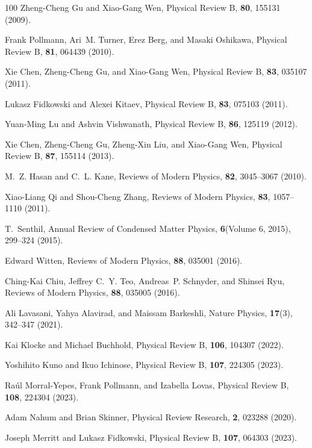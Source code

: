 \documentclass[preprint,pteplogo]{ptephy_v2}%
\numberwithin{equation}{section}
\theoremstyle{definition}
\begin{document}
\begin{thebibliography}{100}
Zheng-Cheng Gu and Xiao-Gang Wen, Physical Review B, {\bf 80}, 155131 (2009).

Frank Pollmann, Ari~M. Turner, Erez Berg, and Masaki Oshikawa, Physical Review B, {\bf 81}, 064439 (2010).

Xie Chen, Zheng-Cheng Gu, and Xiao-Gang Wen, Physical Review B, {\bf 83}, 035107 (2011).

Lukasz Fidkowski and Alexei Kitaev, Physical Review B, {\bf 83}, 075103 (2011).

Yuan-Ming Lu and Ashvin Vishwanath, Physical Review B, {\bf 86}, 125119 (2012).

Xie Chen, Zheng-Cheng Gu, Zheng-Xin Liu, and Xiao-Gang Wen, Physical Review B, {\bf 87}, 155114 (2013).

M.~Z. Hasan and C.~L. Kane, Reviews of Modern Physics, {\bf 82}, 3045--3067 (2010).

Xiao-Liang Qi and Shou-Cheng Zhang, Reviews of Modern Physics, {\bf 83}, 1057--1110 (2011).

T.~Senthil, Annual Review of Condensed Matter Physics, {\bf 6}(Volume 6, 2015), 299--324 (2015).

Edward Witten, Reviews of Modern Physics, {\bf 88}, 035001 (2016).

Ching-Kai Chiu, Jeffrey C.~Y. Teo, Andreas~P. Schnyder, and Shinsei Ryu, Reviews of Modern Physics, {\bf 88}, 035005 (2016).

Ali Lavasani, Yahya Alavirad, and Maissam Barkeshli, Nature Physics, {\bf 17}(3), 342--347 (2021).

Kai Klocke and Michael Buchhold, Physical Review B, {\bf 106}, 104307 (2022).

Yoshihito Kuno and Ikuo Ichinose, Physical Review B, {\bf 107}, 224305 (2023).

Ra\'ul Morral-Yepes, Frank Pollmann, and Izabella Lovas, Physical Review B, {\bf 108}, 224304 (2023).

Adam Nahum and Brian Skinner, Physical Review Research, {\bf 2}, 023288 (2020).

Joseph Merritt and Lukasz Fidkowski, Physical Review B, {\bf 107}, 064303 (2023).


\end{thebibliography}
\end{document}
